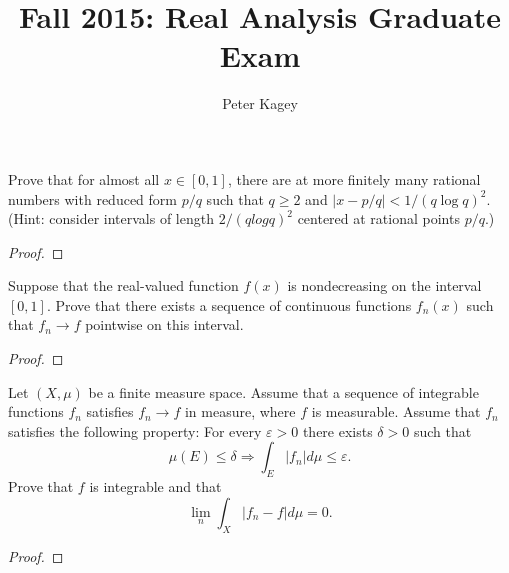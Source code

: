 \documentclass{article}
\newenvironment{problem}[2][Problem]{\begin{trivlist}
\item[\hskip \labelsep {\bfseries #1}\hskip \labelsep {\bfseries #2.}]}{\end{trivlist}}
\begin{document}
\title{Fall 2015: Real Analysis Graduate Exam}
\author{Peter Kagey}

\maketitle

\begin{problem}{1}
  Prove that for almost all $x \in [0, 1]$, there are at more finitely many
  rational numbers with reduced form $p/q$ such that $q \geq 2$ and
  $|x - p/q| < 1/(q \log q)^2$.
  (Hint: consider intervals of length $2/(q log q)^2$ centered at rational points $p/q$.)
\end{problem}

\begin{proof}
\end{proof}

\pagebreak

\begin{problem}{2}
  Suppose that the real-valued function $f(x)$ is nondecreasing on the interval $[0, 1]$.
  Prove that there exists a sequence of continuous functions $f_n(x)$ such that
  $f_n \rightarrow f$ pointwise on this interval.
\end{problem}

\begin{proof}
\end{proof}

\pagebreak

\begin{problem}{3}
  Let $(X, \mu)$ be a finite measure space. Assume that a sequence of integrable
  functions $f_n$ satisfies $f_n \rightarrow f$ in measure, where $f$ is
  measurable. Assume that $f_n$ satisfies the following property:
  For every $\varepsilon > 0$ there exists $\delta > 0$ such that \[
    \mu(E) \leq \delta \Longrightarrow \int_E |f_n| d\mu \leq \varepsilon.
  \]
  Prove that $f$ is integrable and that \[
    \lim_n \int_X |f_n - f| d\mu = 0.
  \]
\end{problem}

\begin{proof}
\end{proof}
\end{document}
